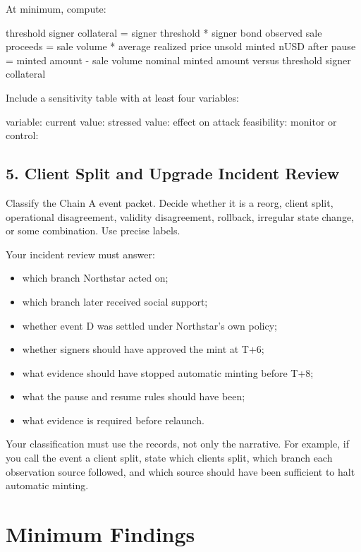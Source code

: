 At minimum, compute:

\begin{codeblock}
threshold signer collateral = signer threshold * signer bond
observed sale proceeds = sale volume * average realized price
unsold minted nUSD after pause = minted amount - sale volume
nominal minted amount versus threshold signer collateral
\end{codeblock}

Include a sensitivity table with at least four variables:

\begin{codeblock}
variable:
    current value:
    stressed value:
    effect on attack feasibility:
    monitor or control:
\end{codeblock}

\subsection*{5. Client Split and Upgrade Incident Review}

Classify the Chain A event packet. Decide whether it is a reorg, client split, operational disagreement, validity disagreement, rollback, irregular state change, or some combination. Use precise labels.

Your incident review must answer:

\begin{itemize}
\item which branch Northstar acted on;
\item which branch later received social support;
\item whether event D was settled under Northstar's own policy;
\item whether signers should have approved the mint at T+6;
\item what evidence should have stopped automatic minting before T+8;
\item what the pause and resume rules should have been;
\item what evidence is required before relaunch.
\end{itemize}

Your classification must use the records, not only the narrative. For example, if you call the event a client split, state which clients split, which branch each observation source followed, and which source should have been sufficient to halt automatic minting.

\section*{Minimum Findings}

